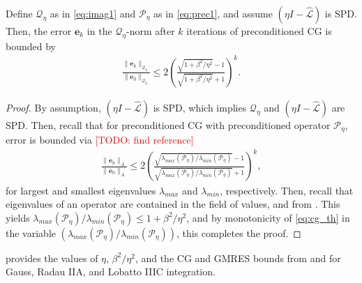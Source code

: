 \documentclass[review]{siamart}
\makeatletter
\newcommand{\todo}[1]{\textcolor{red}{[TODO\@: #1]}}
\makeatother
\begin{document}
%
\begin{corollary}\label{cor:cg}
Define $\mathcal{Q}_\eta$ as in \eqref{eq:imag1} and $\mathcal{P}_\eta$ as in \eqref{eq:prec1},
and assume $(\eta I - \widehat{\mathcal{L}})$ is SPD. Then, the error $\mathbf{e}_k$ in the
$\mathcal{Q}_\eta$-norm after $k$ iterations of preconditioned CG is bounded by
\begin{align*}
\frac{\|\mathbf{e}_k\|_{\mathcal{Q}_\eta}}{\|\mathbf{e}_0\|_{\mathcal{Q}_\eta}}
	\leq 2\left(\frac{\sqrt{1+\beta^2/\eta^2}-1}{\sqrt{1+\beta^2/\eta^2}+1}\right)^{k}.
\end{align*}
\end{corollary}
\begin{proof}
By assumption, $(\eta I - \widehat{\mathcal{L}})$ is SPD, which implies $\mathcal{Q}_\eta$
and $(\eta I - \widehat{\mathcal{L}})$ are SPD. Then, recall that for preconditioned CG
with preconditioned operator $\mathcal{P}_\eta$, error is bounded via \todo{find reference}
\begin{align}\label{eq:cg_th}
\frac{\|\mathbf{e}_k\|_{A}}{\|\mathbf{e}_0\|_{A}}
	\leq 2\left(\frac{\sqrt{\lambda_{max}(\mathcal{P}_\eta)/\lambda_{min}(\mathcal{P}_\eta)}-1}
	{\sqrt{\lambda_{max}(\mathcal{P}_\eta)/\lambda_{min}(\mathcal{P}_\eta)}+1}\right)^{k},
\end{align}
%
for largest and smallest eigenvalues $\lambda_{max}$ and $\lambda_{min}$, respectively.
Then, recall that eigenvalues of an operator are contained in the field of values, and
from . This yields $\lambda_{max}(\mathcal{P}_\eta)/\lambda_{min}(\mathcal{P}_\eta)
\leq 1+\beta^2/\eta^2$, and by monotonicity of \eqref{eq:cg_th} in the variable
$(\lambda_{max}(\mathcal{P}_\eta)/\lambda_{min}(\mathcal{P}_\eta))$, this completes
the proof.
\end{proof}
%

 provides the values of $\eta$, $\beta^2/\eta^2$, and the CG and GMRES
bounds from  and  for Gauss, Radau IIA, and Lobatto IIIC
integration.
\end{document}
